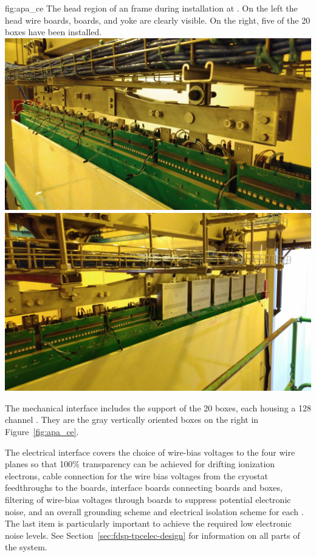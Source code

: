 \begin{dunefigure}{fig:apa_ce}
{The head region of an  frame during installation at .  On the left the head wire boards,  boards, and yoke are clearly visible. On the right, five of the 20  boxes have been installed.}
\includegraphics[height=0.2\textheight]{graphics/sp-apa-yolk-photo.jpg}
\includegraphics[height=0.2\textheight]{graphics/sp-apa-ceboxes-photo.jpg}
\end{dunefigure}

The mechanical interface includes the support of the \num{20}  boxes, each housing a \num{128} channel .  They are the gray vertically oriented boxes  on the right in Figure~\ref{fig:apa_ce}. 

The electrical interface covers the choice of wire-bias voltages to the four wire planes so that \num{100}\% transparency can be achieved for drifting ionization electrons, cable connection for the wire bias voltages from the cryostat feedthroughs to the  boards, interface boards connecting  boards and  boxes, filtering of wire-bias voltages through  boards to suppress potential electronic noise, and an overall grounding scheme and electrical isolation scheme for each . The last item is particularly important to achieve the required low electronic noise levels.  See Section~\ref{sec:fdsp-tpcelec-design} %
for information on all parts of the  system.


